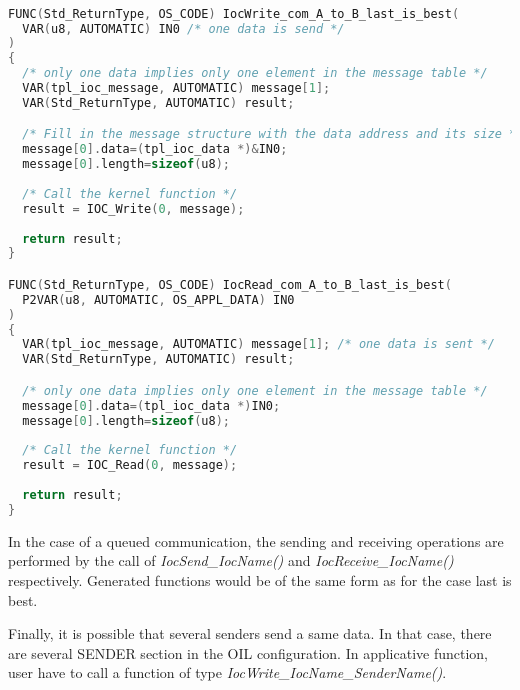 \begin{lstlisting}[language=C]

FUNC(Std_ReturnType, OS_CODE) IocWrite_com_A_to_B_last_is_best(
  VAR(u8, AUTOMATIC) IN0 /* one data is send */
)
{
  /* only one data implies only one element in the message table */
  VAR(tpl_ioc_message, AUTOMATIC) message[1]; 
  VAR(Std_ReturnType, AUTOMATIC) result;

  /* Fill in the message structure with the data address and its size */
  message[0].data=(tpl_ioc_data *)&IN0;
  message[0].length=sizeof(u8);
  
  /* Call the kernel function */
  result = IOC_Write(0, message); 
  
  return result;
}

FUNC(Std_ReturnType, OS_CODE) IocRead_com_A_to_B_last_is_best(
  P2VAR(u8, AUTOMATIC, OS_APPL_DATA) IN0
)
{
  VAR(tpl_ioc_message, AUTOMATIC) message[1]; /* one data is sent */
  VAR(Std_ReturnType, AUTOMATIC) result;

  /* only one data implies only one element in the message table */
  message[0].data=(tpl_ioc_data *)IN0;
  message[0].length=sizeof(u8);
  
  /* Call the kernel function */
  result = IOC_Read(0, message);
  
  return result;
}

\end{lstlisting}


In the case of a queued communication, the sending and receiving operations are performed by the call of \textit{IocSend_IocName()} and \textit{IocReceive_IocName()} respectively. Generated functions would be of the same form as for the case last is best.

Finally, it is possible that several senders send a same data. In that case, there are several SENDER section in the OIL configuration. In applicative function, user have to call a function of type \textit{IocWrite_IocName_SenderName()}.